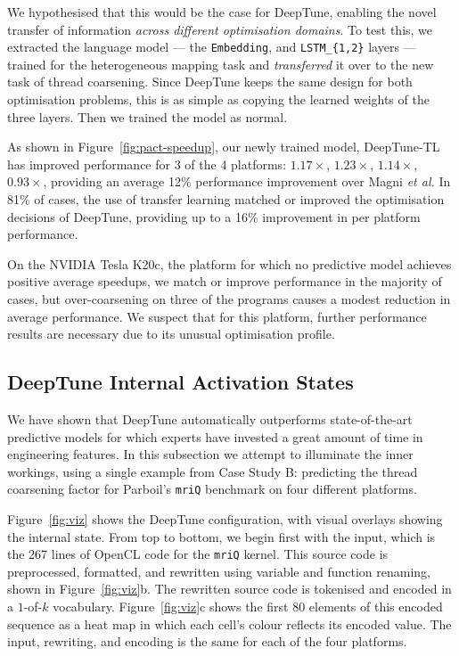 We hypothesised that this would be the case for DeepTune, enabling the novel transfer of information \emph{across different optimisation domains}. To test this, we extracted the language model --- the \texttt{Embedding}, and \texttt{LSTM\_\{1,2\}} layers --- trained for the heterogeneous mapping task and \emph{transferred} it over to the new task of thread coarsening. Since DeepTune keeps the same design for both optimisation problems, this is as simple as copying the learned weights of the three layers. Then we trained the model as normal.

As shown in Figure~\ref{fig:pact-speedup}, our newly trained model, DeepTune-TL has improved performance for 3 of the 4 platforms: $1.17\times$, $1.23\times$, $1.14\times$, $0.93\times$, providing an average 12\% performance improvement over Magni \emph{et al.}  In 81\% of cases, the use of transfer learning matched or improved the optimisation decisions of DeepTune, providing up to a 16\% improvement in per platform performance.

On the NVIDIA Tesla K20c, the platform for which no predictive model achieves positive average speedups, we match or improve performance in the majority of cases, but over-coarsening on three of the programs causes a modest reduction in average performance. We suspect that for this platform, further performance results are necessary due to its unusual optimisation profile.


\subsection{DeepTune Internal Activation States}



We have shown that DeepTune automatically outperforms state-of-the-art predictive models for which experts have invested a great amount of time in engineering features. In this subsection we attempt to illuminate the inner workings, using a single example from Case Study B: predicting the thread coarsening factor for Parboil's \texttt{mriQ} benchmark on four different platforms.

Figure~\ref{fig:viz} shows the DeepTune configuration, with visual overlays showing the internal state. From top to bottom, we begin first with the input, which is the 267 lines of OpenCL code for the \texttt{mriQ} kernel. This source code is preprocessed, formatted, and rewritten using variable and function renaming, shown in Figure~\ref{fig:viz}b. The rewritten source code is tokenised and encoded in a $1$-of-$k$ vocabulary. Figure~\ref{fig:viz}c shows the first 80 elements of this encoded sequence as a heat map in which each cell's colour reflects its encoded value. The input, rewriting, and encoding is the same for each of the four platforms.

